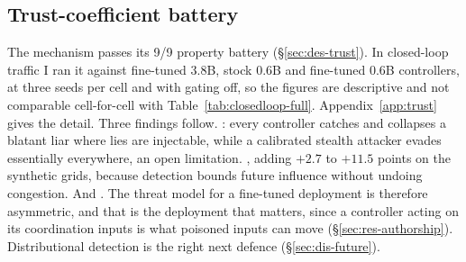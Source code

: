 \subsection{Trust-coefficient battery}\label{sec:res-trust}
The mechanism passes its 9/9 property battery (\S\ref{sec:des-trust}). In
closed-loop traffic I ran it against fine-tuned 3.8B, stock 0.6B and
fine-tuned 0.6B controllers, at three seeds per cell and with gating off,
so the figures are descriptive and not comparable cell-for-cell with
Table~\ref{tab:closedloop-full}. Appendix~\ref{app:trust} gives the
detail. Three findings follow. : every controller
catches and collapses a blatant liar where lies are injectable, while a
calibrated stealth attacker evades essentially everywhere, an open
limitation. ,
adding $+2.7$ to $+11.5$ points on the synthetic grids, because detection
bounds future influence without undoing congestion. And
. The threat model
for a fine-tuned deployment is therefore asymmetric, and that is the
deployment that matters, since a controller acting on its coordination
inputs is what poisoned inputs can move (\S\ref{sec:res-authorship}).
Distributional detection is the right next defence
(\S\ref{sec:dis-future}).
